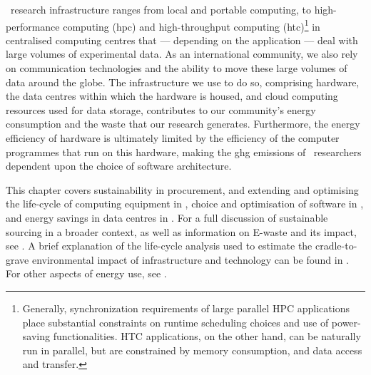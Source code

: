 \documentclass[../SustainableHEP.tex]{subfiles}
\begin{document}
\ACR\ research infrastructure ranges from local and portable computing, to high-performance computing (\acrshort{hpc}) and high-throughput computing (\acrshort{htc})\footnote{Generally, synchronization requirements of large parallel HPC applications place substantial constraints on runtime scheduling choices and use of power-saving functionalities.  HTC applications, on the other hand, can be naturally run in parallel, but are constrained by memory consumption, and data access and transfer.} in centralised computing centres that {---} depending on the application {---} deal with large volumes of experimental data. As an international community, we also rely on communication technologies and the ability to move these large volumes of data around the globe. The infrastructure we use to do so, comprising hardware, the data centres within which the hardware is housed, and cloud computing resources used for data storage, contributes to our community's energy consumption and the waste that our research generates.  Furthermore, the energy efficiency of hardware is ultimately limited by the efficiency of the computer programmes that run on this hardware, making the \acrshort{ghg} emissions of \ACR\ researchers dependent upon the choice of software architecture.

This chapter covers sustainability in procurement, and  extending and optimising the life-cycle of computing equipment in , choice and optimisation of software in , and energy savings in data centres in .  For a full discussion of sustainable sourcing in a broader context, as well as information on E-waste and its impact, see . A brief explanation of the life-cycle analysis used to estimate the cradle-to-grave environmental impact of infrastructure and technology can be found in .  For other aspects of energy use, see .
\end{document}
